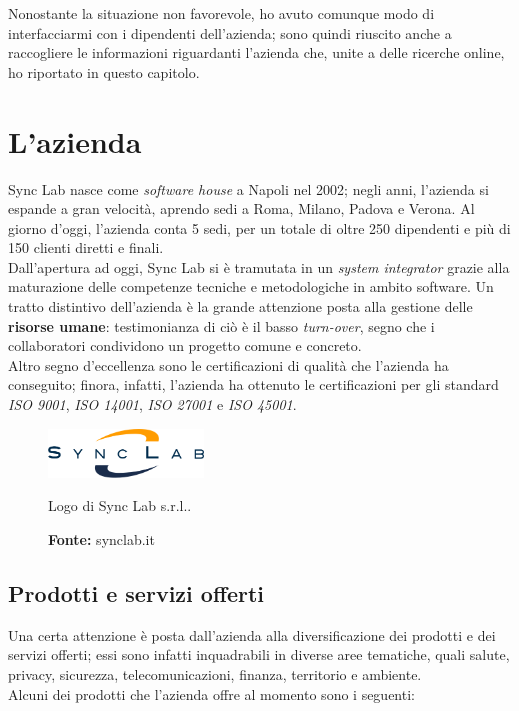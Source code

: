 Nonostante la situazione non favorevole, ho avuto comunque modo di interfacciarmi con i dipendenti dell'azienda; sono quindi riuscito anche a raccogliere le informazioni riguardanti l'azienda che, unite a delle ricerche online, ho riportato in questo capitolo.

\section{L'azienda}

Sync Lab nasce come \textit{software house} a Napoli nel 2002; negli anni, l'azienda si espande a gran velocità, aprendo sedi a Roma, Milano, Padova e Verona. Al giorno d'oggi, l'azienda conta 5 sedi, per un totale di oltre 250 dipendenti e più di 150 clienti diretti e finali. \\
Dall'apertura ad oggi, Sync Lab si è tramutata in un \textit{system integrator} grazie alla maturazione delle competenze tecniche e metodologiche in ambito software. Un tratto distintivo dell'azienda è la grande attenzione posta alla gestione delle \textbf{risorse umane}: testimonianza di ciò è il basso \textit{turn-over}, segno che i collaboratori condividono un progetto comune e concreto. \\
Altro segno d'eccellenza sono le certificazioni di qualità che l'azienda ha conseguito; finora, infatti, l'azienda ha ottenuto le certificazioni per gli standard \textit{ISO 9001}, \textit{ISO 14001}, \textit{ISO 27001} e \textit{ISO 45001}. \\

\begin{figure}[htbp]
  \begin{center}
    \includegraphics[height=1.3cm]{immagini/synclab-logo}
  \end{center}
  \caption{Logo di Sync Lab s.r.l..}
  \caption*{\textbf{Fonte:} synclab.it}
\end{figure}

\subsection*{Prodotti e servizi offerti}

Una certa attenzione è posta dall'azienda alla diversificazione dei prodotti e dei servizi offerti; essi sono infatti inquadrabili in diverse aree tematiche, quali salute, privacy, sicurezza, telecomunicazioni, finanza, territorio e ambiente. \\
Alcuni dei prodotti che l'azienda offre al momento sono i seguenti:

